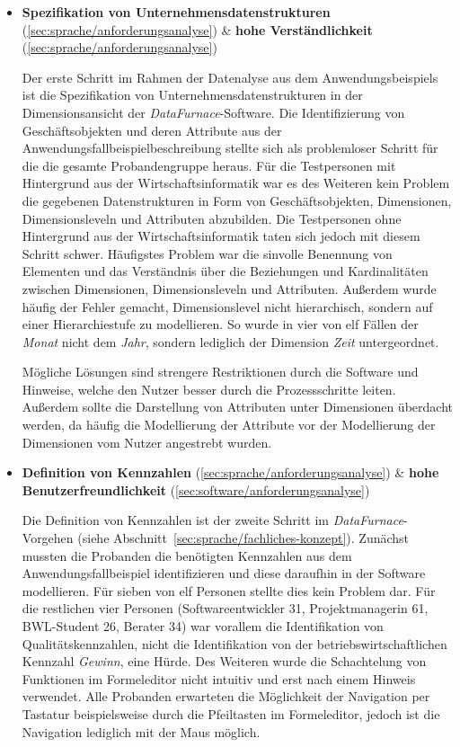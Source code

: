 \documentclass[
  language=german, %
  type=bachelor,%
  ngerman
]{isthesis}
\begin{document}
\begin{content}
\begin{itemize}
  \item \textbf{Spezifikation von Unternehmensdatenstrukturen} (\ref{sec:sprache/anforderungsanalyse}) \& \textbf{hohe Verständlichkeit} (\ref{sec:sprache/anforderungsanalyse})

    Der erste Schritt im Rahmen der Datenalyse aus dem Anwendungsbeispiels ist
    die Spezifikation von Unternehmensdatenstrukturen in der Dimensionsansicht
    der \textit{DataFurnace}-Software. Die Identifizierung von
    Geschäftsobjekten und deren Attribute aus der
    Anwendungsfallbeispielbeschreibung stellte sich als problemloser Schritt
    für die die gesamte Probandengruppe heraus. Für die Testpersonen mit
    Hintergrund aus der Wirtschaftsinformatik war es des Weiteren kein Problem
    die gegebenen Datenstrukturen in Form von Geschäftsobjekten, Dimensionen,
    Dimensionsleveln und Attributen abzubilden. Die Testpersonen ohne
    Hintergrund aus der Wirtschaftsinformatik taten sich jedoch mit diesem
    Schritt schwer. Häufigstes Problem war die sinvolle Benennung von Elementen
    und das Verständnis über die Beziehungen und Kardinalitäten zwischen
    Dimensionen, Dimensionsleveln und Attributen. Außerdem wurde häufig der
    Fehler gemacht, Dimensionslevel nicht hierarchisch, sondern auf einer
    Hierarchiestufe zu modellieren. So wurde in vier von elf Fällen
    der \textit{Monat} nicht dem \textit{Jahr}, sondern lediglich der Dimension
    \textit{Zeit} untergeordnet. 
    
    Mögliche Lösungen sind strengere Restriktionen durch die
    Software und Hinweise, welche den Nutzer besser durch die Prozessschritte
    leiten. Außerdem sollte die Darstellung von Attributen unter Dimensionen
    überdacht werden, da häufig die Modellierung der Attribute vor der
    Modellierung der Dimensionen vom Nutzer angestrebt wurden.

  \item \textbf{Definition von Kennzahlen} (\ref{sec:sprache/anforderungsanalyse}) \& \textbf{hohe Benutzerfreundlichkeit} (\ref{sec:software/anforderungsanalyse})

    Die Definition von Kennzahlen ist der zweite Schritt im
    \textit{DataFurnace}-Vorgehen (siehe
    Abschnitt~\ref{sec:sprache/fachliches-konzept}). Zunächst mussten die
    Probanden die benötigten Kennzahlen aus dem Anwendungsfallbeispiel
    identifizieren und diese daraufhin in der Software modellieren. Für sieben
    von elf Personen stellte dies kein Problem dar.  Für die restlichen vier
    Personen (Softwareentwickler 31, Projektmanagerin 61, BWL-Student 26,
    Berater 34) war vorallem die Identifikation von Qualitätskennzahlen, nicht
    die Identifikation von der betriebswirtschaftlichen Kennzahl
    \textit{Gewinn}, eine Hürde. Des Weiteren wurde die Schachtelung von
    Funktionen im Formeleditor nicht intuitiv und erst nach einem Hinweis
    verwendet. Alle Probanden erwarteten die Möglichkeit der
    Navigation per Tastatur beispielsweise durch die Pfeiltasten im
    Formeleditor, jedoch ist die Navigation lediglich mit der Maus möglich.


\end{itemize}
\end{content}
\end{document}
